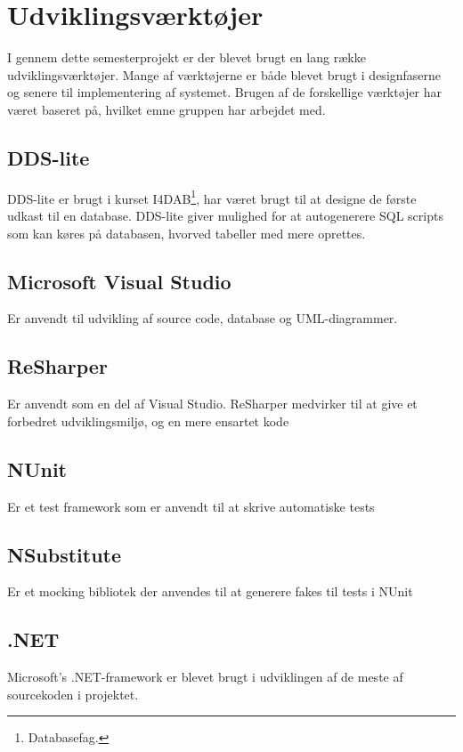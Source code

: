 \chapter{Udviklingsværktøjer}

I gennem dette semesterprojekt er der blevet brugt en lang række udviklingsværktøjer. Mange af værktøjerne er både blevet brugt i designfaserne og senere til implementering af systemet. Brugen af de forskellige værktøjer har været baseret på, hvilket emne gruppen har arbejdet med.

\section*{DDS-lite}
DDS-lite er brugt i kurset I4DAB\footnote{Databasefag.}, har været brugt til at designe de første udkast til en database. DDS-lite giver mulighed for at autogenerere SQL scripts som kan køres på databasen, hvorved tabeller med mere oprettes.

\section*{Microsoft Visual Studio}
Er anvendt til udvikling af source code, database og UML-diagrammer.

\section*{ReSharper} %
Er anvendt som en del af Visual Studio. ReSharper medvirker til at give et forbedret udviklingsmiljø, og en mere ensartet kode 

\section*{NUnit}
Er et test framework som er anvendt til at skrive automatiske tests

\section*{NSubstitute}
Er et mocking bibliotek der anvendes til at generere fakes til tests i NUnit

\section*{.NET}
Microsoft's .NET-framework er blevet brugt i udviklingen af de meste af sourcekoden i projektet.

